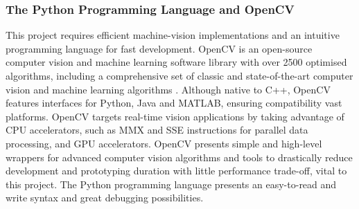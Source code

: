 \subsubsection{The Python Programming Language and OpenCV}
This project requires efficient machine-vision implementations and an intuitive programming language for fast development. OpenCV is an open-source computer vision and machine learning software library with over 2500 optimised algorithms, including a comprehensive set of classic and state-of-the-art computer vision and machine learning algorithms \cite{opencv}. Although native to C++, OpenCV features interfaces for Python, Java and MATLAB, ensuring compatibility vast platforms. OpenCV targets real-time vision applications by taking advantage of CPU accelerators, such as MMX and SSE instructions for parallel data processing, and GPU accelerators. OpenCV presents simple and high-level wrappers for advanced computer vision algorithms and tools to drastically reduce development and prototyping duration with little performance trade-off, vital to this project. The Python programming language presents an easy-to-read and write syntax and great debugging possibilities.
